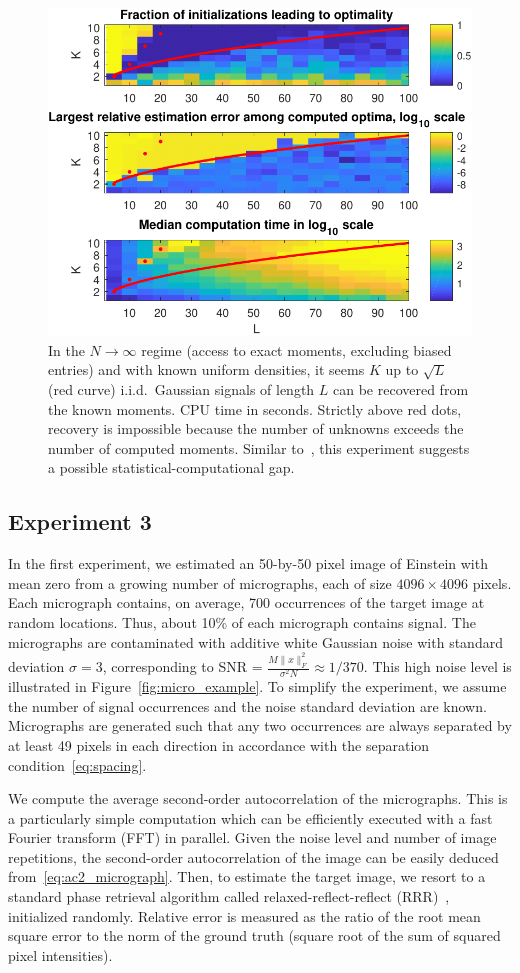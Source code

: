 \documentclass[12pt]{article}
\newcommand{\1}{\mathbf{1}}
\theoremstyle{plain}
\theoremstyle{definition}
\theoremstyle{remark}
\theoremstyle{plain}
\theoremstyle{remark}
\theoremstyle{plain}
\theoremstyle{plain}
\theoremstyle{plain}
\numberwithin{equation}{section}
\begin{document}
\begin{figure}[t]
	\centering
	\includegraphics[width=.7\linewidth]{KLXP/XP1}
	\caption{In the $N \to \infty$ regime (access to exact moments, excluding biased entries) and with known uniform densities, it seems $K$ up to $\sqrt{L}$ (red curve) i.i.d.\ Gaussian signals of length $L$ can be recovered from the known moments. CPU time in seconds. Strictly above red dots, recovery is impossible because the number of unknowns exceeds the number of computed moments. Similar to~\cite[Fig.~4.1]{boumal2017heterogeneous}, this experiment suggests a possible statistical-computational gap.}
	\label{fig:KLXP}
\end{figure}


\subsection{Experiment 3}

In the first experiment, we estimated 
an 50-by-50 pixel image of Einstein with mean zero from a growing number of micrographs, each of size $4096\times 4096$ pixels. Each micrograph contains, on average, 700 occurrences of the target image at random locations. 
Thus, about 10\% of each micrograph contains signal. The micrographs are contaminated with additive white Gaussian noise with standard deviation $\sigma=3$,  corresponding  to SNR = $\frac{M\|x\|_F^2} {\sigma^2N} \approx1/370$. This high noise level is illustrated in Figure~\ref{fig:micro_example}. 
To simplify the experiment, we assume the number of signal occurrences and the noise standard deviation are known. Micrographs are generated such that any two occurrences are always separated by at least 49 pixels in each direction in accordance with the separation condition~\eqref{eq:spacing}. 

We compute the average second-order autocorrelation of the micrographs. This is a particularly simple computation which can be efficiently executed with a fast Fourier transform (FFT) in parallel.  
Given the noise level and number of image repetitions, the second-order autocorrelation of the image can be easily deduced from~\eqref{eq:ac2_micrograph}.  Then, to estimate the target image, we resort to a standard phase retrieval algorithm called relaxed-reflect-reflect (RRR)~\cite{elser2017rrr}, initialized randomly.
Relative error is measured as the ratio of the root mean square error to the norm of the ground truth (square root of the sum of squared pixel intensities).
\end{document}
